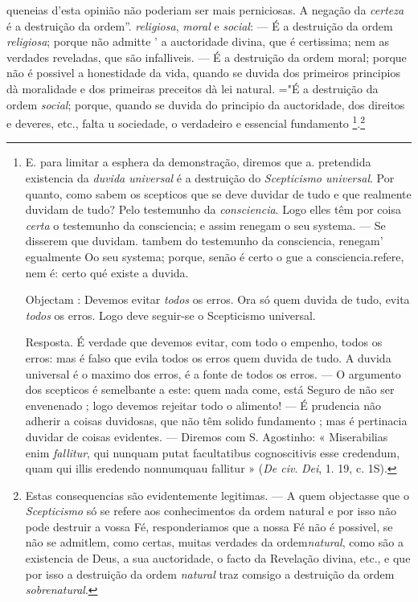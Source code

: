 queneias d'esta opinião não poderiam ser mais perniciosas. A negação da \emph{certeza} é a destruição da ordem”. \emph{religiosa}, \emph{moral} e \emph{social}: --- É a destruição da ordem \emph{religiosa}; porque não admitte ' a auctoridade divina, que é certissima; nem as verdades reveladas, que são infalliveis. --- É a destruição da ordem moral; porque não é possivel a honestidade da vida, quando se duvida dos primeiros principios dà moralidade e dos primeiras preceitos dà lei natural. ="É a destruição da ordem \emph{social}; porque, quando se duvida do principio da auctoridade, dos direitos e deveres, etc., falta u sociedade, o verdadeiro e essencial fundamento \footnote{E. para limitar a esphera da demonstração, diremos que a. pretendida existencia da \emph{duvida universal} é a destruição do \emph{Scepticismo universal}. Por quanto, como sabem os scepticos que se deve duvidar de tudo e que realmente duvidam de tudo? Pelo testemunho da \emph{consciencia}. Logo elles têm por coisa \emph{certa} o testemunho da consciencia; e assim renegam o seu systema. --- Se disserem que duvidam. tambem do testemunho da consciencia, renegam' egualmente Oo seu systema; porque, senão é certo o gue a consciencia.refere, nem é: certo qué existe a duvida.\par Objectam : Devemos evitar \emph{todos} os erros. Ora só quem duvida de tudo, evita \emph{todos} os erros. Logo deve seguir-se o Scepticismo universal.\par Resposta. É verdade que devemos evitar, com todo o empenho, todos os erros: mas é falso que evila todos os erros quem duvida de tudo. A duvida universal é o maximo dos erros, é a fonte de todos os erros. --- O argumento dos scepticos é semelbante a este: quem nada come, está Seguro de não ser envenenado ; logo devemos rejeitar todo o alimento! --- É prudencia não adherir a coisas duvidosas, que não têm solido fundamento ; mas é pertinacia duvidar de coisas evidentes. --- Diremos com S. Agostinho: « Miserabilias enim \emph{fallitur}, qui nunquam putat facultatibus cognoscitivis esse credendum, quam qui illis eredendo nonnumquau fallitur » (\emph{De civ}. \emph{Dei}, 1. 19, c. 1S).}.\footnote{Estas consequencias são evidentemente legitimas. --- A quem objectasse que o \emph{Scepticismo} só se refere aos conhecimentos da ordem natural e por isso não pode destruir a vossa Fé, responderiamos que a nossa Fé não é possivel, se não se admitlem, como certas, muitas verdades da ordem\emph{natural}, como são a existencia de Deus, a sua auctoridade, o facto da Revelação divina, etc., e que por isso a destruição da ordem \emph{natural} traz comsigo a destruição da ordem \emph{sobrenatural}.}


